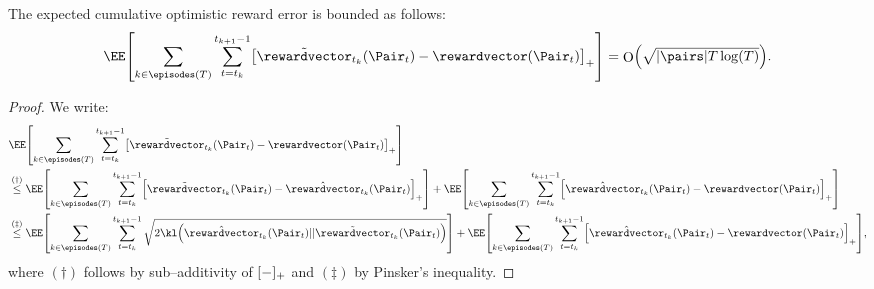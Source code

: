 \documentclass[preprint,cleveref,12pt]{colt2025}
\DeclarePairedDelimiter{\brackets}{[}{]}	%
\DeclarePairedDelimiter{\parens}{(}{)}	%
\DeclarePairedDelimiter{\abs}{\lvert}{\rvert}	%
\DeclarePairedDelimiter{\pospart}{[}{]_{+}}	%
\newcommand{\tsqrt}[1]{{\textstyle\sqrt{#1}}} %
\DeclareMathOperator*{\OH}{\mathrm{O}}
\def\reward{\rewardvector}
\begin{document}
    \begin{lemma}
    \label{lemma_expected_reward_error}
        The expected cumulative optimistic reward error is bounded as follows:
        \begin{equation*}
            \EE \brackets*{
                \sum_{k \in \episodes(T)}
                \sum_{t = t_k}^{t_{k+1}-1}
                \pospart*{
                    \tilde{\reward}_{t_k}(\Pair_t) - \reward(\Pair_t)
                }
            }
            =
            \OH \parens*{
                \tsqrt{\abs{\pairs} T \log(T)}
            }
            .
        \end{equation*}
    \end{lemma}
    \begin{proof}
        We write:
        \begin{align*}
            & \EE \brackets*{
                \sum_{k \in \episodes(T)}
                \sum_{t = t_k}^{t_{k+1}-1}
                \pospart*{
                    \tilde{\reward}_{t_k}(\Pair_t) - \reward(\Pair_t)
                }
            }
            \\
            & \overset{(\dagger)}\le
            \EE \brackets*{
                \sum_{k \in \episodes(T)}
                \sum_{t = t_k}^{t_{k+1}-1}
                \pospart*{
                    \tilde{\reward}_{t_k}(\Pair_t) - \hat{\reward}_{t_k}(\Pair_t)
                }
            }
            +
            \EE \brackets*{
                \sum_{k \in \episodes(T)}
                \sum_{t = t_k}^{t_{k+1}-1}
                \pospart*{
                    \hat{\reward}_{t_k}(\Pair_t) - \reward(\Pair_t)
                }
            }
            \\
            & \overset{(\ddagger)}\le 
            \EE \brackets*{
                \sum_{k \in \episodes(T)}
                \sum_{t = t_k}^{t_{k+1}-1}
                \sqrt{
                    2 \kl\parens*{
                        \hat{\reward}_{t_k}(\Pair_t)
                        ||
                        \tilde{\reward}_{t_k}(\Pair_t) 
                    }
                }
            }
            +
            \EE \brackets*{
                \sum_{k \in \episodes(T)}
                \sum_{t = t_k}^{t_{k+1}-1}
                \pospart*{
                    \hat{\reward}_{t_k}(\Pair_t) - \reward(\Pair_t)
                }
            }
            ,
        \end{align*}
        where $(\dagger)$ follows by sub--additivity of $\pospart{-}$ and $(\ddagger)$ by Pinsker's inequality. 


\end{proof}
\end{document}

